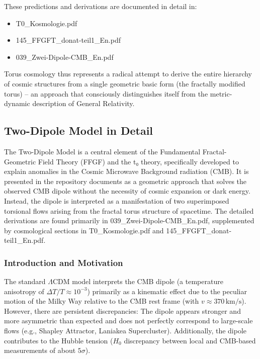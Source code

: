 These predictions and derivations are documented in detail in:
\begin{itemize}
	\item T0\_Kosmologie.pdf
	\item 145\_FFGFT\_donat-teil1\_En.pdf
	\item 039\_Zwei-Dipole-CMB\_En.pdf
\end{itemize}

Torus cosmology thus represents a radical attempt to derive the entire hierarchy of cosmic structures from a single geometric basic form (the fractally modified torus) – an approach that consciously distinguishes itself from the metric-dynamic description of General Relativity.

\subsection{Two-Dipole Model in Detail}

The Two-Dipole Model is a central element of the Fundamental Fractal-Geometric Field Theory (FFGF) and the t₀ theory, specifically developed to explain anomalies in the Cosmic Microwave Background radiation (CMB). It is presented in the repository documents as a geometric approach that solves the observed CMB dipole without the necessity of cosmic expansion or dark energy. Instead, the dipole is interpreted as a manifestation of two superimposed torsional flows arising from the fractal torus structure of spacetime. The detailed derivations are found primarily in 039\_Zwei-Dipole-CMB\_En.pdf, supplemented by cosmological sections in T0\_Kosmologie.pdf and 145\_FFGFT\_donat-teil1\_En.pdf.

\subsubsection{Introduction and Motivation}

The standard $\Lambda$CDM model interprets the CMB dipole (a temperature anisotropy of $\Delta T / T \approx 10^{-3}$) primarily as a kinematic effect due to the peculiar motion of the Milky Way relative to the CMB rest frame (with $v \approx 370\,\text{km/s}$). However, there are persistent discrepancies: The dipole appears stronger and more asymmetric than expected and does not perfectly correspond to large-scale flows (e.g., Shapley Attractor, Laniakea Supercluster). Additionally, the dipole contributes to the Hubble tension ($H_0$ discrepancy between local and CMB-based measurements of about $5\sigma$).

